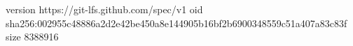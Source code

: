 version https://git-lfs.github.com/spec/v1
oid sha256:002955c48886a2d2e42be450a8e144905b16bf2b6900348559c51a407a83c83f
size 8388916
